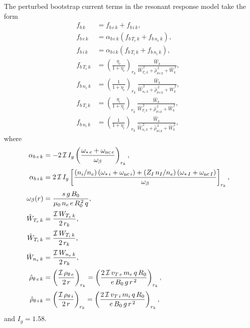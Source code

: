 \documentclass[12pt,prb,aps]{revtex4-1}
\begin{document}
The perturbed bootstrap current terms in the resonant response model take the form\,\cite{rfx,rfy}
\begin{align}
f_{b\,k} &= f_{b\,e\,k}+f_{b\,i\,k},\\[0.5ex]
f_{b\,e\,k} &= \alpha_{b\,e\,k}\left(f_{b\,T_e\,k} + f_{b\,n_e\,k}\right),\\[0.5ex]
f_{b\,i\,k} &= \alpha_{b\,i\,k}\left(f_{b\,T_i\,k} + f_{b\,n_i\,k}\right),\\[0.5ex]
f_{b\,T_e\,k}&=\left(\frac{\eta_e}{1+\eta_e}\right)_{r_k}\,\frac{\hat{W}_k}{\hat{W}_{T_e\,k}^{\,2}+\hat{\rho}_{\theta\,e\,k}^{\,2}+\hat{W}_k^{\,2}},\\[0.5ex]
f_{b\,n_e\,k}&=\left(\frac{1}{1+\eta_e}\right)_{r_k}\,\frac{\hat{W}_k}{\hat{W}_{n_e\,k}^{\,2}+\hat{\rho}_{\theta\,e\,k}^{\,2}+\hat{W}_k^{\,2}},\\[0.5ex]
f_{b\,T_i\,k}&=\left(\frac{\eta_i}{1+\eta_i}\right)_{r_k}\,\frac{\hat{W}_k}{\hat{W}_{T_i\,k}^{\,2}+\hat{\rho}_{\theta\,i\,k}^{\,2}+\hat{W}_k^{\,2}},\\[0.5ex]
f_{b\,n_i\,k}&=\left(\frac{1}{1+\eta_i}\right)_{r_k}\,\frac{\hat{W}_k}{\hat{W}_{n_e\,k}^{\,2}+\hat{\rho}_{\theta\,i\,k}^{\,2}+\hat{W}_k^{\,2}},
\end{align}
where
\begin{align}
\alpha_{b\,e\,k} &= -2\,{\cal I}\,I_g\left(\frac{\omega_{\ast\,e}+\omega_{{\rm nc}\,e}}{\omega_\beta}\right)_{r_k},\\[0.5ex]
\alpha_{b\,i\,k} &= 2\,{\cal I}\,I_g\left[\frac{(n_i/n_e)\left(\omega_{\ast\,i}+\omega_{{\rm nc}\,i}\right)+(Z_I\,n_I/n_e)\left(\omega_{\ast\,I}+\omega_{{\rm nc}\,I}\right)}{\omega_\beta}\right]_{r_k},\\[0.5ex]
\omega_{\beta}(r)&= \frac{s\,g\,B_0}{\mu_0\,n_e\,e\,R_0^{\,2}\,q},\\[0.5ex]
\hat{W}_{T_e\,k} &=\frac{{\cal I}\,W_{T_e\,k}}{2\,r_k} ,\\[0.5ex]
\hat{W}_{T_i\,k} &= \frac{{\cal I}\,W_{T_i\,k}}{2\,r_k},\\[0.5ex]
\hat{W}_{n_e\,k} &= \frac{{\cal I}\,W_{n_e\,k}}{2\,r_k},\\[0.5ex]
\hat{\rho}_{\theta\,e\, k} &= \left(\frac{{\cal I}\,\rho_{\theta\,e}}{2\,r}\right)_{r_k}=\left(\frac{2\,{\cal I}\,v_{T\,e}\,m_e\,q\,R_0}{e\,B_0\,g\,r^{\,2}}\right)_{r_k},\\[0.5ex]
\hat{\rho}_{\theta\,i\,k} &= \left(\frac{{\cal I}\,\rho_{\theta\,i}}{2\,r}\right)_{r_k}= \left(\frac{2\,{\cal I}\,v_{T\,i}\,m_i\,q\,R_0}{e\,B_0\,g\,r^{\,2}}\right)_{r_k},
\end{align}
and $I_g = 1.58$.
\end{document}
